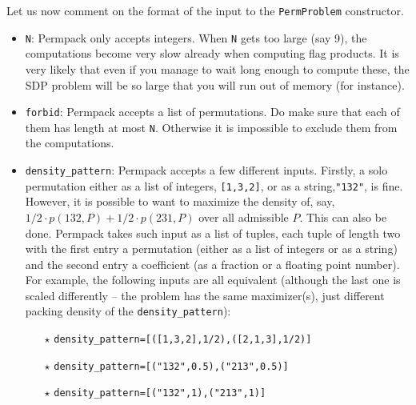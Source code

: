 \documentclass[12pt, a4paper, twoside]{report}
\begin{document}
Let us now comment on the format of the input to the \texttt{PermProblem} constructor. 
\begin{itemize}
\item \texttt{N}: Permpack only accepts integers. When \texttt{N} gets too large (say 9), the computations become very slow already when computing flag products. It is very likely that even if you manage to wait long enough to compute these, the SDP problem will be so large that you will run out of memory (for instance).
\item \texttt{forbid}: Permpack accepts a list of permutations. Do make sure that each of them has length at most \texttt{N}. Otherwise it is impossible to exclude them from the computations.
\item \texttt{density\_pattern}: Permpack accepts a few different inputs. Firstly, a solo permutation either as a list of integers, \texttt{[1,3,2]}, or as a string,\texttt{"132"}, is fine. However, it is possible to want to maximize the density of, say, $1/2\cdot p(132,P) + 1/2\cdot p(231,P)$ over all admissible $P$. This can also be done. Permpack takes such input as a list of tuples, each tuple of length two with the first entry a permutation (either as a list of integers or as a string) and the second entry a coefficient (as a fraction or a floating point number). For example, the following inputs are all equivalent (although the last one is scaled differently -- the problem has the same maximizer(s), just different packing density of the \texttt{density\_pattern}):
\begin{itemize}
\item[$\star$] \texttt{density\_pattern=[([1,3,2],1/2),([2,1,3],1/2)]}
\item[$\star$] \texttt{density\_pattern=[("132",0.5),("213",0.5)]}
\item[$\star$] \texttt{density\_pattern=[("132",1),("213",1)]}
\end{itemize}
\end{itemize}
\end{document}
